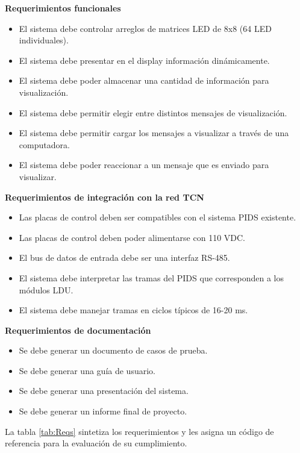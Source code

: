 \textbf{Requerimientos funcionales
}\begin{itemize}
\item El sistema debe controlar arreglos de matrices LED de 8x8 (64 LED individuales).
\item El sistema debe presentar en el display información dinámicamente.
\item El sistema debe poder almacenar una cantidad de información para visualización.
\item El sistema debe permitir elegir entre distintos mensajes de visualización.
\item El sistema debe permitir cargar los mensajes a visualizar a través de una computadora.
\item El sistema debe poder reaccionar a un mensaje que es enviado para visualizar.
\end{itemize}

\textbf{Requerimientos de integración con la red TCN
}\begin{itemize}
\item Las placas de control deben ser compatibles con el sistema PIDS existente.
\item Las placas de control deben poder alimentarse con 110 VDC.
\item El bus de datos de entrada debe ser una interfaz RS-485.
\item El sistema debe interpretar las tramas del PIDS que corresponden a los módulos LDU.
\item El sistema debe manejar tramas en ciclos típicos de 16-20 ms.
\end{itemize}

\textbf{Requerimientos de documentación
}\begin{itemize}
\item Se debe generar un documento de casos de prueba.
\item Se debe generar una guía de usuario.
\item Se debe generar una presentación del sistema.
\item Se debe generar un informe final de proyecto.
\end{itemize}

La tabla \ref{tab:Reqs} sintetiza los requerimientos y les asigna un código de referencia para la evaluación de su cumplimiento.
	
